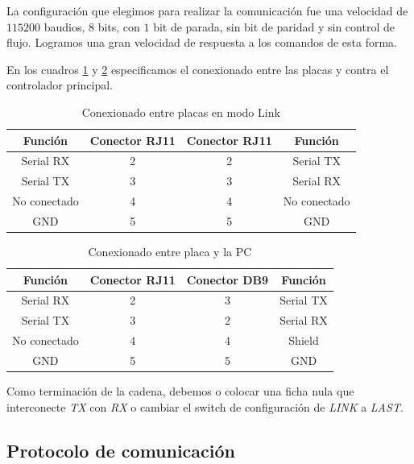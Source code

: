 La configuraci\'on que elegimos para realizar la comunicaci\'on fue una velocidad de $115200$ baudios, $8$ bits, con $1$ bit de parada,
sin bit de paridad y sin control de flujo.
Logramos una gran velocidad de respuesta a los comandos de esta forma.

En los cuadros \ref{hT_comm_conexionLink} y \ref{hT_comm_conexionRS232} especificamos el conexionado entre las placas
y contra el controlador principal.

\begin{table}[ht]
	\begin{center}
		\begin{tabular}{|c|c|c|c|}
			\hline
			Funci\'on & Conector RJ11 & Conector RJ11 & Funci\'on\\
			\hline
			Serial RX & 2 & 2 & Serial TX \\
			\hline
			Serial TX & 3 & 3 & Serial RX \\
			\hline
			No conectado & 4 & 4 & No conectado \\
			\hline
			GND & 5 & 5 &  GND\\
			\hline
		\end{tabular}
		\caption{Conexionado entre placas en modo Link}
		\label{hT_comm_conexionLink}
	\end{center}
\end{table}

\begin{table}[ht]
	\begin{center}
		\begin{tabular}{|c|c|c|c|}
			\hline
			Funci\'on & Conector RJ11 & Conector DB9 & Funci\'on\\
			\hline
			Serial RX & 2 & 3 & Serial TX \\
			\hline
			Serial TX & 3 & 2 & Serial RX \\
			\hline
			No conectado & 4 & 4 & Shield \\
			\hline
			GND & 5 & 5 &  GND\\
			\hline
		\end{tabular}
		\caption{Conexionado entre placa y la PC}
		\label{hT_comm_conexionRS232}
	\end{center}
\end{table}

Como terminaci\'on de la cadena, debemos o colocar una ficha nula que interconecte \emph{TX} con \emph{RX} o
cambiar el switch de configuraci\'on de \emph{LINK} a \emph{LAST}.

\subsection{Protocolo de comunicaci\'on}
\label{h_comm_protocolo}

